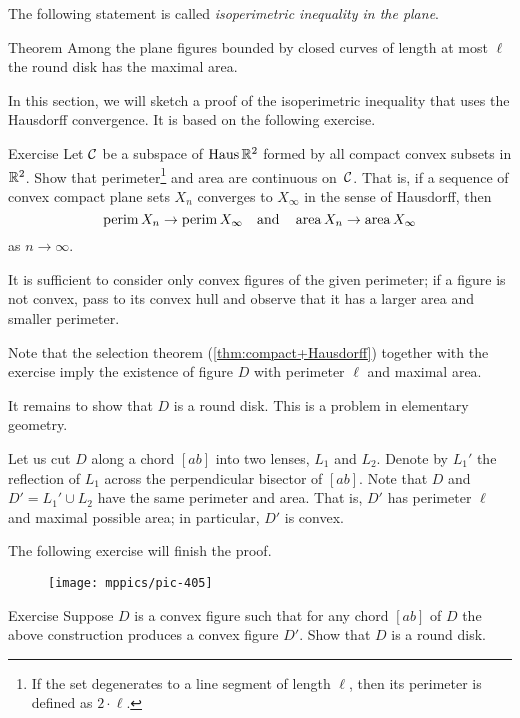 The following statement is called \emph{isoperimetric inequality in the plane}.

\begin{thm}{Theorem}\label{thm:isoperimetric}
Among the plane figures bounded by closed curves of length at most $\ell$ the round disk has the maximal area.
\end{thm}

In this section, we will sketch a proof of the isoperimetric inequality that uses the Hausdorff convergence.
It is based on the following exercise.

\begin{thm}{Exercise}\label{ex:Huas-perimeter-area}
Let $\mathcal{C}$ be a subspace of $\operatorname{\rm Haus}\nolimits\mathbb{R}^2$ formed by all compact convex subsets in $\mathbb{R}^2$.
Show that perimeter\footnote{If the set degenerates to a line segment of length $\ell$, then its perimeter is defined as $2\cdot \ell$.} and area are continuous on~$\mathcal{C}$.
That is, if a sequence of convex compact plane sets $X_n$ converges to $X_\infty$ in the sense of Hausdorff, then 
\[\operatorname{\rm perim}\nolimits X_n\to \operatorname{\rm perim}\nolimits X_\infty\quad\text{and}\quad\operatorname{\rm area}\nolimits X_n\to\operatorname{\rm area}\nolimits X_\infty\]
as $n\to\infty$.
\end{thm}

It is sufficient to consider only convex figures of the given perimeter; if a figure is not convex, pass to its convex hull and observe that it has a larger area and smaller perimeter.


Note that the selection theorem (\ref{thm:compact+Hausdorff}) together with the exercise imply the existence of figure $D$ with perimeter $\ell$ and maximal area.

It remains to show that $D$ is a round disk.
This is a problem in elementary geometry.

Let us cut $D$ along a chord $[ab]$ into two lenses, $L_1$ and $L_2$.
Denote by $L_1'$ the reflection of $L_1$ across the perpendicular bisector of $[ab]$.
Note that $D$ and $D'=L_1'\cup L_2$ have the same perimeter and area.
That is, $D'$ has perimeter $\ell$ and maximal possible area;
in particular, $D'$ is convex.

The following exercise will finish the proof.
\qeds

{

\begin{wrapfigure}{o}{57 mm}
\vskip-5mm
\centering
\texttt{[image: mppics/pic-405]}
\end{wrapfigure}

\begin{thm}{Exercise}\label{ex:round-disc}
Suppose $D$ is a convex figure such that for any chord $[ab]$ of $D$ the above construction produces a convex figure $D'$.
Show that $D$ is a round disk.
\end{thm}


}

